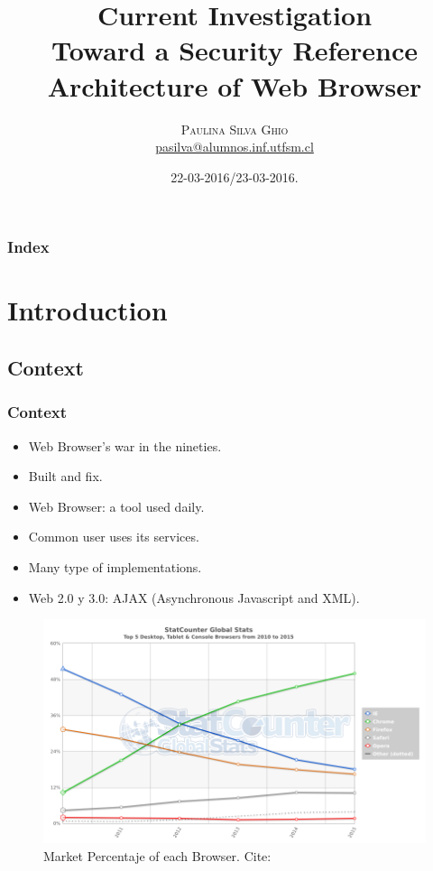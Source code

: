 \documentclass[serif,9pt]{beamer}
\begin{document}
\title{Current Investigation\\ Toward a Security Reference Architecture of Web Browser} 
\author[Paulina Silva Ghio]{\textsc{Paulina Silva Ghio} \\ \medskip
\small{}
\medskip
\url{pasilva@alumnos.inf.utfsm.cl}}
\institute[]{}
\date{22-03-2016/23-03-2016.}

\begin{frame}[plain]
\titlepage
\end{frame}


\begin{frame}
\frametitle{Index}
\tableofcontents
\end{frame} 


\section{Introduction}
\subsection{Context}
\begin{frame}
	\frametitle{Context}

	\begin{itemize}
		\item<1-> Web Browser's war in the nineties. 
		\item<1-> Built and fix.
		\item<1-> Web Browser: a tool used daily.
		\item<2-> Common user uses its services.
		\item<2-> Many type of implementations.
		\item<2-> Web 2.0 y 3.0: AJAX (Asynchronous Javascript and XML).
	\end{itemize}
	\begin{figure}[h]
	    \centering
	    \includegraphics[scale=0.3]{figures/StatCounter-browser-ww-yearly-2010-2015.png}
	    \caption{Market Percentaje of each Browser. Cite: \cite{statBrow}}
	    \label{fig:UsageShare}
	\end{figure}
\end{frame}
\end{document}
